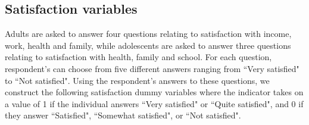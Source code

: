 \subsection{Satisfaction variables}

Adults are asked to answer four questions relating to satisfaction with income, work, health and family, while adolescents are asked to answer three questions relating to satisfaction with health, family and school. For each question, respondent's can choose from five different answers ranging from ``Very satisfied" to ``Not satisfied". Using the respondent's answers to these questions, we construct the following satisfaction dummy variables where the indicator takes on a value of 1 if the individual answers ``Very satisfied" or ``Quite satisfied", and 0 if they answer ``Satisfied", ``Somewhat satisfied", or ``Not satisfied".

\begin{table}[H]

\begin{center}
\end{center}
\end{table}


